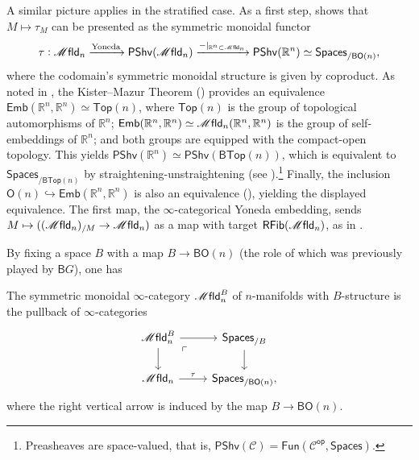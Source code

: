 \documentclass[../text]{subfiles}
\begin{document}
A similar picture applies in the stratified case. As a first step, \cite[Corollary 2.13]{af_fhtop} shows that $M\mapsto\tau_M$ can be presented as the symmetric monoidal functor
%
\begin{equation}
    \tau: \mfld_n \xrightarrow{\mathrm{Yoneda}} \mathsf{PShv}(\mfld_n) \xrightarrow{-|_{\mathbb{R}^n \subset \mfld_n}} \mathsf{PShv}(\mathbb{R}^n) \simeq \mathsf{Spaces}_{/\mathsf{BO}(n)},
\end{equation}
where the codomain's symmetric monoidal structure is given by coproduct. As noted in \cite{af_fhtop}, the Kister--Mazur Theorem (\cite{kister1964microbundles}) provides an equivalence $\mathsf{Emb}(\mathbb{R}^n,\mathbb{R}^n)\simeq \mathsf{Top}(n)$, where $\mathsf{Top}(n)$ is the group of topological automorphisms of $\mathbb{R}^n$; $\mathsf{Emb}(\mathbb{R}^n,\mathbb{R}^n)\simeq\mfld_n(\mathbb{R}^n,\mathbb{R}^n)$ is the group of self-embeddings of $\mathbb{R}^n$; and both groups are equipped with the compact-open topology. This yields $\mathsf{PShv}(\mathbb{R}^n)\simeq\mathsf{PShv}(\mathsf{BTop}(n))$, which is equivalent to $\mathsf{Spaces}_{/\mathsf{BTop}(n)}$ by straightening-unstraightening (see ).\footnote{Preasheaves are space-valued, that is, $\mathsf{PShv}(\mathscr{C})=\mathsf{Fun}(\mathscr{C}^{\mathsf{op}},\mathsf{Spaces})$.} Finally, the inclusion $\mathsf{O}(n)\hookrightarrow\mathsf{Emb}(\mathbb{R}^n,\mathbb{R}^n)$ is also an equivalence (\cite[Proposition 2.2.6]{ayala2020primer}), yielding the displayed equivalence. The first map, the $\infty$-categorical Yoneda embedding, sends $M\mapsto((\mfld_{n})_{/M}\to\mfld_n)$ as a map with target $\mathsf{RFib}(\mfld_n)$, as in \cite{lurie_htt}.

By fixing a space $B$ with a map $B \rightarrow \mathsf{BO}(n)$ (the role of which was previously played by $\mathsf{B}G$), one has
%
\begin{definition}
    The symmetric monoidal $\infty$-category $\mfld_n^B$ of $n$-manifolds with $B$-structure is the pullback of $\infty$-categories
    \begin{equation}
        \begin{tikzcd}
            \mfld_n^B \arrow[dr, phantom, "\ulcorner", very near start] \arrow[r] \arrow[d] & \mathsf{Spaces}_{/B} \arrow[d] \\
            \mfld_n \arrow[r, "\tau"] & \mathsf{Spaces}_{/\mathsf{BO}(n)},
        \end{tikzcd}
    \end{equation}
    where the right vertical arrow is induced by the map $B \rightarrow \mathsf{BO}(n)$.
\end{definition}
\end{document}
